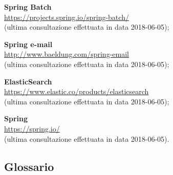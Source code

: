             \item
                \textbf{Spring Batch}\\
                \url{https://projects.spring.io/spring-batch/}\\
                (ultima consultazione effettuata in data 2018-06-05);

            \item
                \textbf{Spring e-mail}\\
                \url{http://www.baeldung.com/spring-email}\\
                (ultima consultazione effettuata in data 2018-06-05);
            \item
                \textbf{ElasticSearch}\\
                \url{https://www.elastic.co/products/elasticsearch} \\
                (ultima consultazione effettuata in data 2018-06-05);

            \item
                \textbf{Spring} \\
                \url{https://spring.io/} \\
                (ultima consultazione effettuata in data 2018-06-05).

    \subsection{Glossario}

        \DescrizioneGlossario{}
